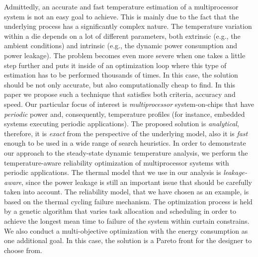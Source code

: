   Admittedly, an accurate and fast temperature estimation of a multiprocessor system is not an easy goal to achieve. This is mainly due to the fact that the underlying process has a significantly complex nature. The temperature variation within a die depends on a lot of different parameters, both extrinsic (e.g., the ambient conditions) and intrinsic (e.g., the dynamic power consumption and power leakage). The problem becomes even more severe when one takes a little step further and puts it inside of an optimization loop where this type of estimation has to be performed thousands of times. In this case, the solution should be not only accurate, but also computationally cheap to find. In this paper we propose such a technique that satisfies both criteria, accuracy and speed.
  Our particular focus of interest is \emph{multiprocessor} system-on-chips that have \emph{periodic} power and, consequently, temperature profiles (for instance, embedded systems executing periodic applications). The proposed solution is \emph{analytical}, therefore, it is \emph{exact} from the perspective of the underlying model, also it is \emph{fast} enough to be used in a wide range of search heuristics. In order to demonstrate our approach to the steady-state dynamic temperature analysis, we perform the temperature-aware reliability optimization of multiprocessor systems with periodic applications.
  The thermal model that we use in our analysis is \emph{leakage-aware}, since the power leakage is still an important issue that should be carefully taken into account. The reliability model, that we have chosen as an example, is based on the thermal cycling failure mechanism.
  The optimization process is held by a genetic algorithm that varies task allocation and scheduling in order to achieve the longest mean time to failure of the system within curtain constrains. We also conduct a multi-objective optimization with the energy consumption as one additional goal. In this case, the solution is a Pareto front for the designer to choose from.
